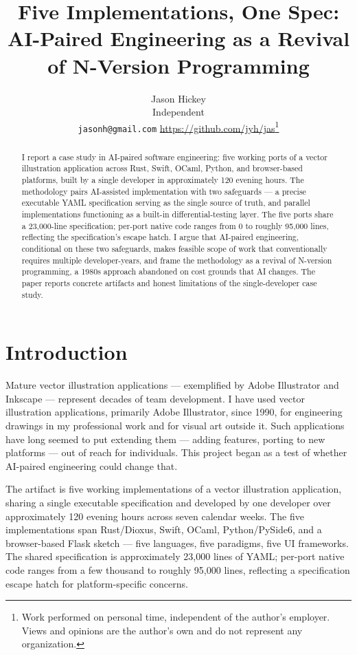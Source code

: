 \documentclass[10pt]{article}
\title{Five Implementations, One Spec:\\
AI-Paired Engineering as a Revival of N-Version Programming}
\author{Jason Hickey\\
Independent\\
\texttt{jasonh@gmail.com} \textperiodcentered{} \url{https://github.com/jyh/jas}\thanks{Work performed on personal time, independent of the author's employer. Views and opinions are the author's own and do not represent any organization.}}
\date{}
\begin{document}
\maketitle

\begin{abstract}
I report a case study in AI-paired software engineering: five working ports
of a vector illustration application across Rust, Swift, OCaml, Python, and
browser-based platforms, built by a single developer in approximately 120
evening hours. The methodology pairs AI-assisted implementation with two
safeguards --- a precise executable YAML specification serving as the single
source of truth, and parallel implementations functioning as a built-in
differential-testing layer. The five ports share a 23{,}000-line
specification; per-port native code ranges from 0 to roughly 95{,}000 lines,
reflecting the specification's escape hatch. I argue that AI-paired
engineering, conditional on these two safeguards, makes feasible scope of
work that conventionally requires multiple developer-years, and frame the
methodology as a revival of N-version programming, a 1980s approach
abandoned on cost grounds that AI changes. The paper reports concrete
artifacts and honest limitations of the single-developer case study.
\end{abstract}

\section{Introduction}

Mature vector illustration applications --- exemplified by Adobe Illustrator
\citep{pfiffner2003adobe} and Inkscape \citep{inkscape} --- represent decades of
team development. I have used vector illustration applications, primarily
Adobe Illustrator, since 1990, for engineering drawings in my professional
work and for visual art outside it. Such applications have long seemed to
put extending them --- adding features, porting to new platforms --- out of
reach for individuals. This project began as a test of whether AI-paired
engineering could change that.

The artifact is five working implementations of a vector illustration
application, sharing a single executable specification and developed by one
developer over approximately 120 evening hours across seven calendar weeks.
The five implementations span Rust/Dioxus, Swift, OCaml, Python/PySide6,
and a browser-based Flask sketch --- five languages, five paradigms, five UI
frameworks. The shared specification is approximately 23{,}000 lines of
YAML; per-port native code ranges from a few thousand to roughly 95{,}000
lines, reflecting a specification escape hatch for platform-specific
concerns.
\end{document}

